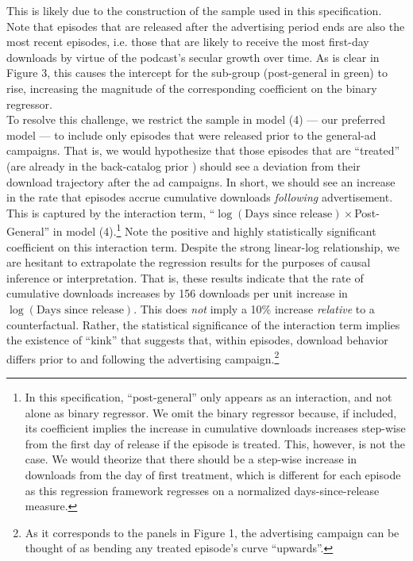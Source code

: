 \documentclass[11pt, letterpaper, twoside]{article}
\begin{document}
This is likely due to the construction of the sample used in this specification. Note that episodes that are released after the advertising period ends are also the most recent episodes, i.e. those that are likely to receive the most first-day downloads by virtue of the podcast's secular growth over time. As is clear in Figure 3, this causes the intercept for the sub-group (post-general in green) to rise, increasing the magnitude of the corresponding coefficient on the binary regressor.\\

To resolve this challenge, we restrict the sample in model (4) --- our preferred model --- to include only episodes that were released prior to the general-ad campaigns. That is, we would hypothesize that those episodes that are ``treated'' (are already in the back-catalog prior ) should see a deviation from their download trajectory after the ad campaigns. In short, we should see an increase in the rate that episodes accrue cumulative downloads \textit{following} advertisement. This is captured by the interaction term, ``$\log(\text{Days since release})\times$Post-General'' in model (4).\footnote{In this specification, ``post-general'' only appears as an interaction, and not alone as binary regressor. We omit the binary regressor because, if included, its coefficient implies the increase in cumulative downloads increases step-wise from the first day of release if the episode is treated. This, however, is not the case. We would theorize that there should be a step-wise increase in downloads from the day of first treatment, which is different for each episode as this regression framework regresses on a normalized days-since-release measure.} Note the positive and highly statistically significant coefficient on this interaction term. Despite the strong linear-log relationship, we are hesitant to extrapolate the regression results for the purposes of causal inference or interpretation. That is, these results indicate that the rate of cumulative downloads increases by 156 downloads per unit increase in $\log(\text{Days since release})$. This does \textit{not} imply a 10\% increase \textit{relative} to a counterfactual. Rather, the statistical significance of the interaction term implies the existence of ``kink'' that suggests that, within episodes, download behavior differs prior to and following the advertising campaign.\footnote{As it corresponds to the panels in Figure 1, the advertising campaign can be thought of as bending any treated episode's curve ``upwards''.}\\
\end{document}

